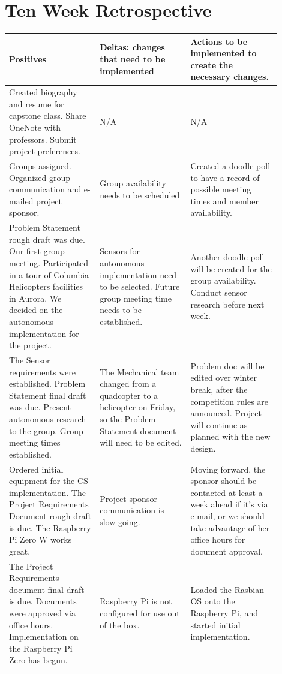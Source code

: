 \documentclass[onecolumn, draftclsnofoot,10pt, compsoc]{IEEEtran}
\begin{document}
\section{Ten Week Retrospective}
\vspace{.25in}
\begin{center}
    \begin{tabular}{|p{0.3\linewidth}|p{0.3\linewidth}|p{0.3\linewidth}|}
        \hline
		 Positives & Deltas: changes that need to be implemented & Actions  to be implemented to create the necessary changes. \\
        \hline
		 Created biography and resume for capstone class. Share OneNote with professors. Submit project preferences. & N/A & N/A  \\
		\hline 
         Groups assigned. Organized group communication and e-mailed project sponsor. & Group availability needs to be scheduled & Created a doodle poll to have a record of possible meeting times and member availability.  \\
		\hline 
         Problem Statement rough draft was due. Our first group meeting. Participated in a tour of Columbia Helicopters facilities in Aurora. We decided on the autonomous implementation for the project. & Sensors for autonomous implementation need to be selected. Future group meeting time needs to be established. & Another doodle poll will  be created for the group availability. Conduct sensor research before next week.  \\
		\hline 
         The Sensor requirements were established. Problem Statement final draft was due. Present autonomous research to the group. Group meeting times established. & The Mechanical team changed from a quadcopter to a helicopter on Friday, so the Problem Statement document will need to be edited. & Problem doc will be edited over winter break, after the competition rules are announced. Project will continue as planned with the new design. \\
		\hline 
         Ordered initial equipment for the CS implementation. The Project Requirements Document rough draft is due. The Raspberry Pi Zero W works great. & Project sponsor communication is slow-going. & Moving forward, the sponsor should be contacted at least a week ahead if it's via e-mail, or we should take advantage of her office hours for document approval. \\
		\hline 
         The Project Requirements document final draft is due. Documents were approved via office hours. Implementation on the Raspberry Pi Zero has begun. & Raspberry Pi is not configured for use out of the box. &  Loaded the Rasbian OS onto the Raspberry Pi, and started initial implementation. \\

\end{tabular}
\end{center}
\end{document}
